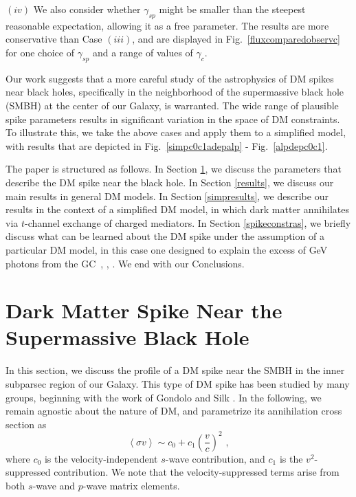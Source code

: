 \documentclass[11pt]{article}
\begin{document}
$(iv)$ We also consider whether $\gamma_{sp}$ might be smaller than the steepest reasonable expectation, allowing it as a free parameter.
The results are more conservative than Case $(iii)$, and are displayed in Fig.~\ref{fluxcomparedobservc} for one choice of $\gamma_{sp}$ and a range of values of $\gamma_c$.

Our work suggests that a more careful study of the astrophysics of DM spikes near black holes, specifically in the neighborhood of the supermassive black hole (SMBH) at the center of our Galaxy, is warranted. The wide range of plausible spike parameters results in significant variation in the space of DM constraints. To illustrate this, we take the above cases and apply them to a simplified model, with results that are depicted in Fig.~\ref{simpc0c1adepalp} - Fig.~\ref{alpdepc0c1}.

The paper is structured as follows.  In Section \ref{spikephysics}, we discuss the parameters that describe the DM spike near the black hole. In Section \ref{results}, we discuss our main results in general DM models. In Section \ref{simpresults}, we describe our results in the context of a simplified DM model, in which dark matter annihilates via $t$-channel exchange of charged mediators. In Section \ref{spikeconstras}, we briefly discuss what can be learned about the DM spike under the assumption of a particular DM model, in this case one designed to explain the excess of GeV photons from the GC~\cite{Daylan:2014rsa}, \cite{Karwin:2016tsw}, \cite{TheFermi-LAT:2015kwa}. We end with our Conclusions.






\section{Dark Matter Spike Near the Supermassive Black Hole} \label{spikephysics}

In this section, we discuss the profile of a DM spike near the SMBH in the inner subparsec region of our Galaxy. This type of DM spike has been studied by many groups, beginning with the work of Gondolo and Silk \cite{Gondolo:1999ef}. 
In the following, we remain agnostic about the nature of DM, and parametrize its annihilation cross section as \cite{Srednicki:1988ce}
%
\begin{equation}\label{eq:partialwave}
\left \langle \sigma v \right \rangle \sim  c_0 + c_1 \left ( \frac{v}{c} \right )^2 \,\,,
\end{equation}
%
where $c_0$ is the velocity-independent $s$-wave contribution, and $c_1$ is the $v^2$-suppressed contribution. We note that the velocity-suppressed terms arise from both $s$-wave and $p$-wave matrix elements. 
\end{document}
